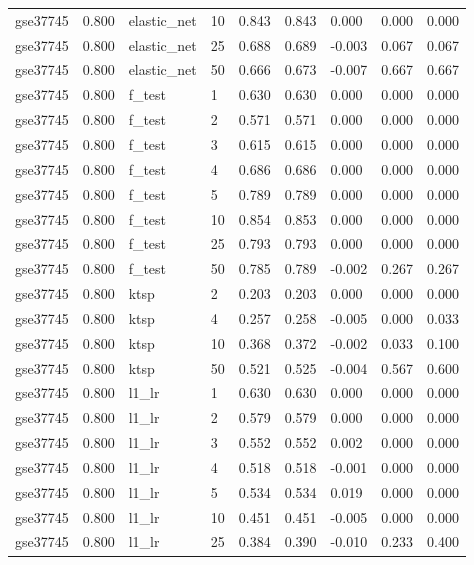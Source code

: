 \begin{table}[t]
\begin{tabular}{lllllllll}
    gse37745 & 0.800 & elastic\_net & 10 & 0.843 & 0.843 & 0.000 & 0.000 & 0.000 \\
    gse37745 & 0.800 & elastic\_net & 25 & 0.688 & 0.689 & -0.003 & 0.067 & 0.067 \\
    gse37745 & 0.800 & elastic\_net & 50 & 0.666 & 0.673 & -0.007 & 0.667 & 0.667 \\
    gse37745 & 0.800 & f\_test & 1 & 0.630 & 0.630 & 0.000 & 0.000 & 0.000 \\
    gse37745 & 0.800 & f\_test & 2 & 0.571 & 0.571 & 0.000 & 0.000 & 0.000 \\
    gse37745 & 0.800 & f\_test & 3 & 0.615 & 0.615 & 0.000 & 0.000 & 0.000 \\
    gse37745 & 0.800 & f\_test & 4 & 0.686 & 0.686 & 0.000 & 0.000 & 0.000 \\
    gse37745 & 0.800 & f\_test & 5 & 0.789 & 0.789 & 0.000 & 0.000 & 0.000 \\
    gse37745 & 0.800 & f\_test & 10 & 0.854 & 0.853 & 0.000 & 0.000 & 0.000 \\
    gse37745 & 0.800 & f\_test & 25 & 0.793 & 0.793 & 0.000 & 0.000 & 0.000 \\
    gse37745 & 0.800 & f\_test & 50 & 0.785 & 0.789 & -0.002 & 0.267 & 0.267 \\
    gse37745 & 0.800 & ktsp & 2 & 0.203 & 0.203 & 0.000 & 0.000 & 0.000 \\
    gse37745 & 0.800 & ktsp & 4 & 0.257 & 0.258 & -0.005 & 0.000 & 0.033 \\
    gse37745 & 0.800 & ktsp & 10 & 0.368 & 0.372 & -0.002 & 0.033 & 0.100 \\
    gse37745 & 0.800 & ktsp & 50 & 0.521 & 0.525 & -0.004 & 0.567 & 0.600 \\
    gse37745 & 0.800 & l1\_lr & 1 & 0.630 & 0.630 & 0.000 & 0.000 & 0.000 \\
    gse37745 & 0.800 & l1\_lr & 2 & 0.579 & 0.579 & 0.000 & 0.000 & 0.000 \\
    gse37745 & 0.800 & l1\_lr & 3 & 0.552 & 0.552 & 0.002 & 0.000 & 0.000 \\
    gse37745 & 0.800 & l1\_lr & 4 & 0.518 & 0.518 & -0.001 & 0.000 & 0.000 \\
    gse37745 & 0.800 & l1\_lr & 5 & 0.534 & 0.534 & 0.019 & 0.000 & 0.000 \\
    gse37745 & 0.800 & l1\_lr & 10 & 0.451 & 0.451 & -0.005 & 0.000 & 0.000 \\
    gse37745 & 0.800 & l1\_lr & 25 & 0.384 & 0.390 & -0.010 & 0.233 & 0.400 \\

\end{tabular}
\end{table}
